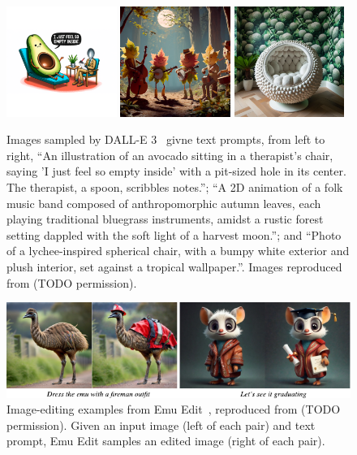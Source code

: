 \begin{figure}[t]
    \centering
    \includegraphics[width=0.32\textwidth]{figs/thesis/dalle3/1.png}
    \hfill
    \includegraphics[width=0.32\textwidth]{figs/thesis/dalle3/2.png}
    \hfill
    \includegraphics[width=0.32\textwidth]{figs/thesis/dalle3/4.png}
    \caption{Images sampled by DALL-E 3~\citep{betker2023improving} givne text prompts, from left to right, ``An illustration of an avocado sitting in a therapist's chair, saying 'I just feel so empty inside' with a pit-sized hole in its center. The therapist, a spoon, scribbles notes.''; ``A 2D animation of a folk music band composed of anthropomorphic autumn leaves, each playing traditional bluegrass instruments, amidst a rustic forest setting dappled with the soft light of a harvest moon.''; and ``Photo of a lychee-inspired spherical chair, with a bumpy white exterior and plush interior, set against a tropical wallpaper.''. Images reproduced from \citet{betker2023improving} (TODO permission).}
    \label{fig:dalle-3-samples}
    \centering
    \includegraphics{figs/thesis/emu_edit_examples.pdf}
    \caption{Image-editing examples from Emu Edit~\citep{sheynin2023emu}, reproduced from \citet{sheynin2023emu} (TODO permission). Given an input image (left of each pair) and text prompt, Emu Edit samples an edited image (right of each pair).}
    \label{fig:emu-edit-samples}
\end{figure}

